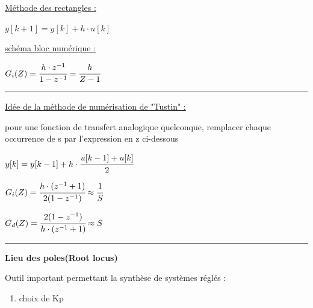\documentclass[	DIV=calc,%
							paper=a4,%
							fontsize=11pt,%
							twocolumn]{scrartcl} %
\newcommand{\hformbar}[1]{\bigskip\hrule\vspace{5pt}} %
\newcounter{mycounter}
\newcommand{\formdesc}[1]{\noindent\textbf{#1} \addtocounter{mycounter}{1} \hfill \themycounter}
\newcommand{\formtitle}[1]{\noindent\underline{#1}}
\begin{document}
\vspace{-3mm}

\formtitle{Méthode des rectangles : }   

\vspace{3mm}

{\hfill $y[k+1] = y[k] + h \cdot u[k]$\hfill} 

\vspace{3mm}

\underline{schéma bloc numérique :}   

\begin{center}
    $G_i(Z) = \cfrac{h \cdot z^{-1}}{1 - z^{-1}}= \cfrac{h}{Z-1}$
\end{center}

\hformbar

\formdesc{Méthode de "Tustin" (trapèzes) : }   

\underline{Idée de la méthode de numérisation de "Tustin" :}

pour une fonction de transfert analogique quelconque, 
remplacer chaque occurrence de s par l'expression en z ci-dessous

\vspace{3mm}

$y[k] = y[k-1] + h \cdot \cfrac{u[k-1]+u[k]}{2}$

\vspace{3mm}

$G_i(Z) = \cfrac{h \cdot (z^{-1}+1)}{2(1 - z^{-1})} \approx \cfrac{1}{S}$


$G_d(Z) = \cfrac{2(1 - z^{-1})}{h \cdot (z^{-1}+1)} \approx S$

\hformbar

\newpage

\formdesc{Lieu des poles(Root locus)}

\footnotesize Outil important permettant la synthèse de systèmes réglés : 
\begin{enumerate}
 \item choix de Kp
\end{enumerate}
\end{document}
